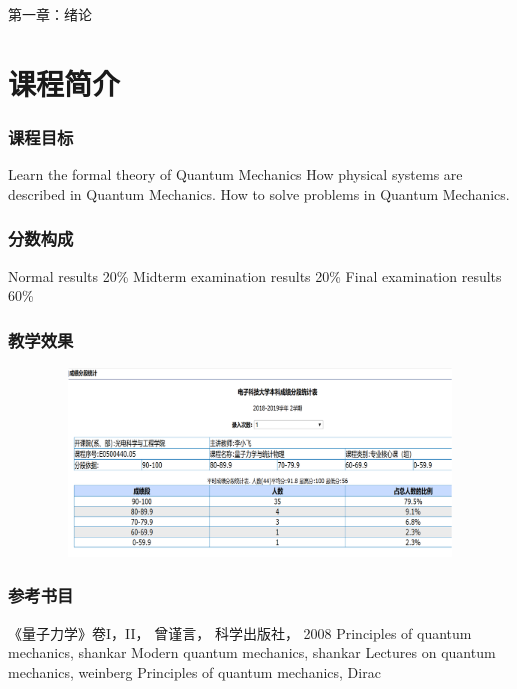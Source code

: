 \begin{frame} [plain]
    \frametitle{}
    \Background[1] 
    \begin{center}
    { {\huge 第一章：绪论 }}
    \end{center}  
    \addtocounter{framenumber}{-1}   
\end{frame}
\section{课程简介}

\begin{frame}[t]
    \frametitle{课程目标}
        \begin{enumerate}
            \Item Learn the formal theory of Quantum Mechanics
            \IItem How physical systems are described in Quantum Mechanics.
            \Item How to solve problems in Quantum Mechanics.
        \end{enumerate}
\end{frame}
\begin{frame} [t]
    \frametitle{分数构成}
        \begin{enumerate}
            \Item Normal results 20\%
            \Item Midterm examination results 20\%
            \Item Final examination results 60\%
        \end{enumerate}
\end{frame}

\begin{frame} [t]
    \frametitle{教学效果}
    \centering
    \includegraphics[width=1.0\textwidth,height=5.0cm]{figs/exam1.png}
\end{frame}

\begin{frame}[t]
    \frametitle{参考书目}
        \begin{itemize}
            \Item 《量子力学》卷I，II， 曾谨言， 科学出版社， 2008           
            \Item Principles of quantum mechanics, shankar
            \Item Modern quantum mechanics, shankar
            \Item Lectures on quantum mechanics, weinberg
            \Item Principles of quantum mechanics, Dirac
        \end{itemize}
\end{frame}

